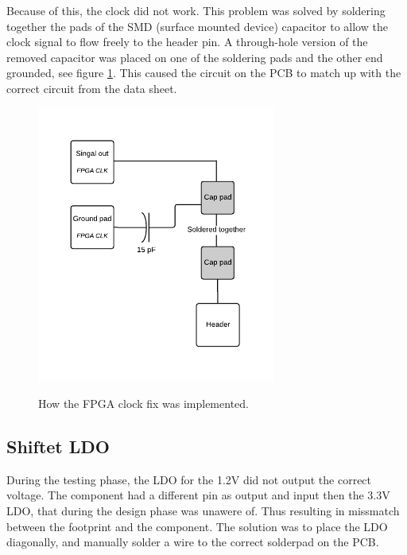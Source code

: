 \documentclass[../main/report.tex]{subfiles}
\begin{document}
Because of this, the clock did not work.
This problem was solved by soldering together the pads of the SMD (surface mounted device) capacitor to allow the clock signal to flow freely to the header pin.
A through-hole version of the removed capacitor was placed on one of the soldering pads and the other end grounded, see figure \ref{fig:pcb-clock-fix}.
This caused the circuit on the PCB to match up with the correct circuit from the data sheet.

\begin{figure}[H]
    \centering
    \includegraphics[width=0.7\textwidth]{../pcb/assets/pcb-clock-fix.pdf}
    \label{fig:pcb-clock-fix}
    \caption{How the FPGA clock fix was implemented.}
\end{figure}

\subsection{Shiftet LDO}
During the testing phase, the LDO for the 1.2V did not output the correct voltage. 
The component had a different pin as output and input then the 3.3V LDO, that during the design phase was unawere of.
Thus resulting in missmatch between the footprint and the component.
The solution was to place the LDO diagonally,  and manually solder a wire to the correct solderpad on the PCB. 
\end{document}
